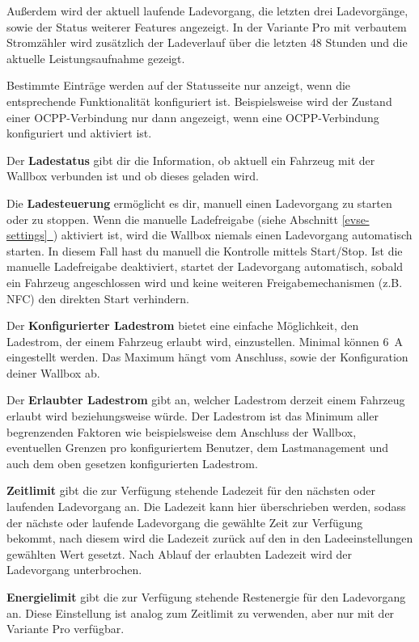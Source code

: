\documentclass[a4paper,10pt]{article}
\newcommand*{\fullref}[1]{Abschnitt \hyperref[{#1}]{\ref*{#1}~\nameref*{#1}}}
\begin{document}
\begin{multicols*}{2}
    Außerdem wird der aktuell laufende Ladevorgang, die letzten drei
    Ladevorgänge, sowie der Status weiterer Features angezeigt.
    In der Variante Pro mit verbautem Stromzähler wird zusätzlich der Ladeverlauf
    über die letzten 48 Stunden und die aktuelle Leistungsaufnahme gezeigt.

    Bestimmte Einträge werden auf der Statusseite nur anzeigt, wenn die entsprechende
    Funktionalität konfiguriert ist. Beispielsweise wird der Zustand einer OCPP-Verbindung
    nur dann angezeigt, wenn eine OCPP-Verbindung konfiguriert und aktiviert ist.

    Der \textbf{Ladestatus} gibt dir die Information, ob aktuell ein
    Fahrzeug mit der Wallbox verbunden ist und ob dieses geladen wird.

    Die \textbf{Ladesteuerung} ermöglicht es dir, manuell einen Ladevorgang zu
    starten oder zu stoppen. Wenn die manuelle Ladefreigabe (siehe \fullref{evse-settings}) aktiviert ist, wird die
    Wallbox niemals einen Ladevorgang automatisch starten. In diesem Fall hast du
    manuell die Kontrolle mittels Start/Stop. Ist die manuelle Ladefreigabe deaktiviert,
    startet der Ladevorgang automatisch, sobald ein Fahrzeug
    angeschlossen wird und keine weiteren Freigabemechanismen (z.B. NFC) den
    direkten Start verhindern.

    Der \textbf{Konfigurierter Ladestrom} bietet eine einfache Möglichkeit, den Ladestrom, der
    einem Fahrzeug erlaubt wird, einzustellen. Minimal können \SI{6}{\ampere} eingestellt werden.
    Das Maximum hängt vom Anschluss, sowie der Konfiguration deiner Wallbox ab.

    Der \textbf{Erlaubter Ladestrom} gibt an, welcher Ladestrom derzeit einem Fahrzeug erlaubt
    wird beziehungsweise würde. Der Ladestrom ist das Minimum aller begrenzenden Faktoren wie
    beispielsweise dem Anschluss der Wallbox, eventuellen Grenzen pro konfiguriertem Benutzer,
    dem Lastmanagement und auch dem oben gesetzen konfigurierten Ladestrom.

    \textbf{Zeitlimit} gibt die zur Verfügung stehende Ladezeit für den nächsten oder laufenden
    Ladevorgang an. Die Ladezeit kann hier überschrieben werden, sodass der nächste oder laufende
    Ladevorgang die gewählte Zeit zur Verfügung bekommt, nach diesem wird die Ladezeit zurück auf den
    in den Ladeeinstellungen gewählten Wert gesetzt. Nach Ablauf der erlaubten Ladezeit wird der Ladevorgang
    unterbrochen.

    \textbf{Energielimit} gibt die zur Verfügung stehende Restenergie für den
    Ladevorgang an. Diese Einstellung ist analog zum Zeitlimit zu verwenden, aber
    nur mit der Variante Pro verfügbar.


\end{multicols*}
\end{document}
